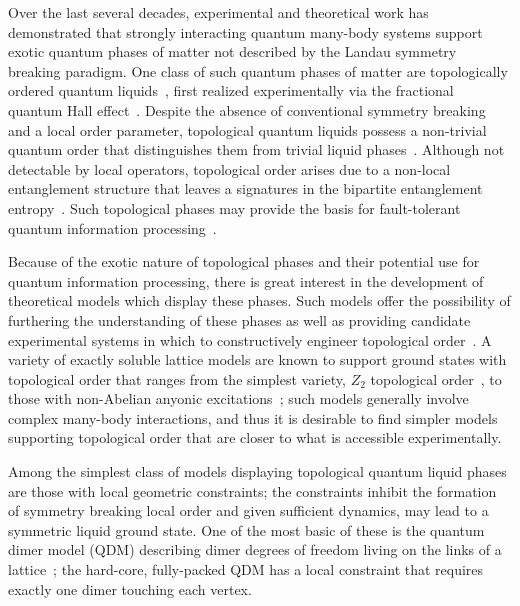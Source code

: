 \documentclass[twocolumn,prb,aps,floatfix,superscriptaddress]{revtex4-1}
\begin{document}
Over the last several decades, experimental and theoretical work has demonstrated that strongly interacting quantum many-body systems support exotic quantum phases of matter not described by the Landau symmetry breaking paradigm. One class of such quantum phases of matter are topologically ordered quantum liquids~\cite{Wen1990}, first realized experimentally via the fractional quantum Hall effect~\cite{Tsui1982,Laughlin1983,Wen1990a,Wen1995}. Despite the absence of conventional symmetry breaking and a local order parameter, topological quantum liquids possess a non-trivial quantum order that distinguishes them from trivial liquid phases~\cite{Nayak2008}. Although not detectable by local operators, topological order arises due to a non-local entanglement structure that leaves a signatures in the bipartite entanglement entropy~\cite{Levin2006a,Kitaev2006b}. Such topological phases may provide the basis for fault-tolerant quantum information processing~\cite{Freedman2001,Kitaev2003}.

Because of the exotic nature of topological phases and their potential use for quantum information processing, there is great interest in the development of theoretical models which display these phases. Such models offer the possibility of furthering the understanding of these phases as well as providing candidate experimental systems in which to constructively engineer topological order~\cite{Duan2003,Jaksch2005,Lewenstein2007,Jiang2008d,Weimer2010a,Herdman2010c,Fowler2012a}. A variety of exactly soluble lattice models are known to support ground states with topological order that ranges from the simplest variety, $Z_2$ topological order~\cite{Kitaev2003,Wen2003}, to those with non-Abelian anyonic excitations~\cite{Levin2005a,Kitaev2006a}; such models generally involve complex many-body interactions, and thus it is desirable to find simpler models supporting topological order that are closer to what is accessible experimentally.

Among the simplest class of models displaying topological quantum liquid phases are those with local geometric constraints; the constraints inhibit the formation of symmetry breaking local order and given sufficient dynamics, may lead to a symmetric liquid ground state. One of the most basic of these is the quantum dimer model (QDM) describing dimer degrees of freedom living on the links of a lattice~\cite{Rokhsar1988,Moessner2008}; the hard-core, fully-packed QDM has a local constraint that requires exactly one dimer touching each vertex.
\end{document}
